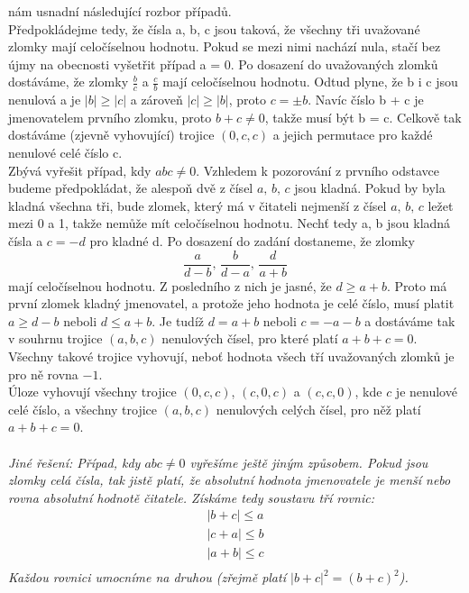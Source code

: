 \documentclass[12pt,a4paper]{report}
\begin{document}
\begin{enumerate}
{		nám usnadní následující rozbor případů.
		\\Předpokládejme tedy, že čísla a, b, c jsou taková, že všechny tři uvažované zlomky
		mají celočíselnou hodnotu. Pokud se mezi nimi nachází nula, stačí bez újmy na obecnosti
		vyšetřit případ a = 0. Po dosazení do uvažovaných zlomků dostáváme, že zlomky $\frac{b}{c}$ a $\frac{c}{b}$ mají celočíselnou hodnotu. Odtud plyne, že b i c jsou nenulová a je $|b|\geq|c|$ a zároveň $|c|\geq|b|$, proto $c = \pm b$. Navíc číslo b + c je jmenovatelem prvního zlomku, proto $b+c\neq0$, takže musí být b = c. Celkově tak dostáváme (zjevně vyhovující) trojice $(0, c, c)$ a jejich permutace pro každé nenulové celé číslo c. \\Zbývá vyřešit případ, kdy $abc\neq0$.
		Vzhledem k pozorování z prvního odstavce budeme předpokládat, že alespoň dvě
		z čísel $a,\, b,\, c$ jsou kladná. Pokud by byla kladná všechna tři, bude zlomek, který má
		v čitateli nejmenší z čísel $a,\, b,\, c$ ležet mezi 0 a 1, takže nemůže mít celočíselnou hodnotu.
		Nechť tedy a, b jsou kladná čísla a $c = -d$ pro kladné d. Po dosazení do zadání dostaneme, že zlomky $$\frac{a}{d-b},\,\frac{b}{d-a},\,\frac{d}{a+b}$$ mají celočíselnou hodnotu. Z posledního z nich je jasné, že $d \geq a + b$. Proto má první
		zlomek kladný jmenovatel, a protože jeho hodnota je celé číslo, musí platit $a \geq d - b$
		neboli $d \leq a+b$. Je tudíž $d = a + b$ neboli $c = - a - b$ a dostáváme tak v souhrnu trojice $(a, b, c)$ nenulových čísel, pro které platí $a + b + c = 0$. Všechny takové trojice vyhovují, neboť hodnota všech tří uvažovaných zlomků je pro ně rovna $-1$.
		\\Úloze vyhovují všechny trojice $(0,c,c)$, $(c,0,c)$ a $(c,c,0)$, kde $c$ je nenulové celé číslo, a všechny trojice $(a,b,c)$ nenulových celých čísel, pro něž platí $a + b + c = 0$.}
	\\\\ \textit{Jiné řešení: Případ, kdy $abc\neq0$ vyřešíme ještě jiným způsobem. Pokud jsou zlomky celá čísla, tak jistě platí, že absolutní hodnota jmenovatele je menší nebo rovna absolutní hodnotě čitatele. Získáme tedy soustavu tří rovnic:
		\begin{align*}
		|b+c| \leq a\\
		|c+a| \leq b\\
		|a+b| \leq c\\
		\end{align*}
		Každou rovnici umocníme na druhou (zřejmě platí $|b+c|^2 = (b+c)^2$).
		\begin{align*}

\end{align*}}
\end{enumerate}
\end{document}
